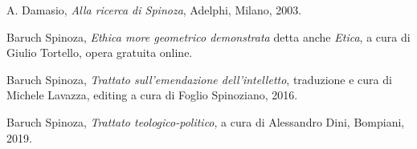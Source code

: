 \begin{thebibliography}{9}
	A. Damasio, \textit{Alla ricerca di Spinoza}, Adelphi, Milano, 2003.

	Baruch Spinoza, \textit{Ethica more geometrico demonstrata} detta anche \textit{Etica}, a cura di Giulio Tortello, opera gratuita online.
	
	Baruch Spinoza, \textit{Trattato sull'emendazione dell'intelletto}, traduzione e cura di Michele Lavazza, editing a cura di Foglio Spinoziano, 2016.
	
	Baruch Spinoza, \textit{Trattato teologico-politico}, a cura di Alessandro Dini, Bompiani, 2019.

\end{thebibliography}
\newpage